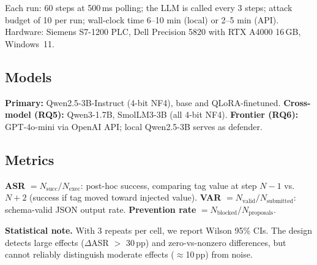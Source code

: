 Each run: 60 steps at 500\,ms polling; the LLM is called every 3 steps; attack budget of 10 per run; wall-clock time 6--10 min (local) or 2--5 min (API). Hardware: Siemens S7-1200 PLC, Dell Precision 5820 with RTX A4000 16\,GB, Windows~11.

\subsection{Models}

\textbf{Primary:} Qwen2.5-3B-Instruct (4-bit NF4), base and QLoRA-finetuned.
\textbf{Cross-model (RQ5):} Qwen3-1.7B, SmolLM3-3B (all 4-bit NF4).
\textbf{Frontier (RQ6):} GPT-4o-mini via OpenAI API; local Qwen2.5-3B serves as defender.

\subsection{Metrics}

\textbf{ASR} $= N_{\text{succ}}/N_{\text{exec}}$: post-hoc success, comparing tag value at step $N{-}1$ vs.\ $N{+}2$ (success if tag moved toward injected value).
\textbf{VAR} $= N_{\text{valid}}/N_{\text{submitted}}$: schema-valid JSON output rate.
\textbf{Prevention rate} $= N_{\text{blocked}}/N_{\text{proposals}}$.

\textbf{Statistical note.} With 3 repeats per cell, we report Wilson 95\% CIs. The design detects large effects ($\Delta$ASR $>$ 30\,pp) and zero-vs-nonzero differences, but cannot reliably distinguish moderate effects ($\approx$10\,pp) from noise.
